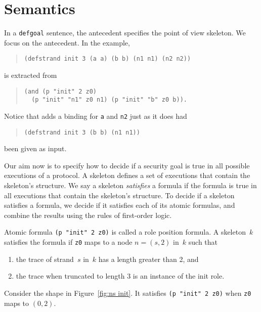 \documentclass[12pt]{article}
\begin{document}
\section{Semantics}\label{sec:semantics}

In a \texttt{defgoal} sentence, the antecedent specifies the point of
view skeleton.  We focus on the antecedent.  In the example,

\begin{quote}
\begin{verbatim}
(defstrand init 3 (a a) (b b) (n1 n1) (n2 n2))
\end{verbatim}
\end{quote}
is extracted from
\begin{quote}
\begin{verbatim}
(and (p "init" 2 z0)
  (p "init" "n1" z0 n1) (p "init" "b" z0 b)).
\end{verbatim}
\end{quote}
Notice that {\cpsa} adds a binding for \texttt{a} and \texttt{n2} just
as it does had
\begin{quote}
\begin{verbatim}
(defstrand init 3 (b b) (n1 n1))
\end{verbatim}
\end{quote}
been given as input.

Our aim now is to specify how to decide if a security goal is true in
all possible executions of a protocol.  A skeleton defines a set of
executions that contain the skeleton's structure.  We say a skeleton
\emph{satisfies} a formula if the formula is true in all executions
that contain the skeleton's structure.  To decide if a skeleton
satisfies a formula, we decide if it satisfies each of its atomic
formulas, and combine the results using the rules of first-order
logic.

Atomic formula \texttt{(p "init" 2 z0)} is called a role position
formula.  A skeleton~$k$ satisfies the formula if \texttt{z0} maps to
a node $n=(s,2)$ in~$k$ such that
\begin{enumerate}
\item the trace of strand~$s$ in~$k$ has a length greater than 2, and
\item the trace when truncated to length 3 is an instance of the init
  role.
\end{enumerate}
Consider the shape in Figure~\ref{fig:ns init}.  It satisfies
\texttt{(p "init" 2 z0)} when \texttt{z0} maps to $(0,2)$.
\end{document}

